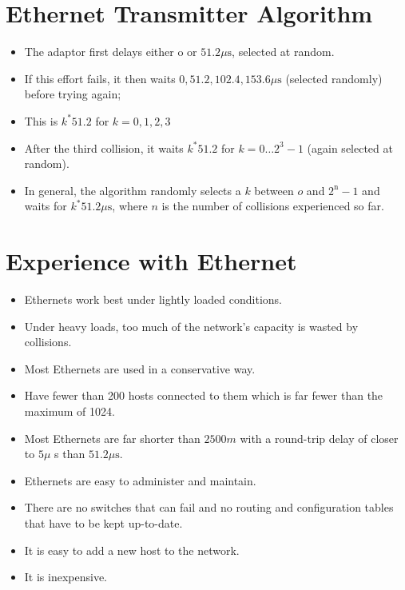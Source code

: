 \documentclass[10pt]{article}
\begin{document}
\section{Ethernet Transmitter Algorithm}
\begin{itemize}
  \item The adaptor first delays either o or $51.2 \mu \mathrm{s}$, selected at random.

  \item If this effort fails, it then waits $0,51.2,102.4,153.6 \mu \mathrm{s}$ (selected randomly) before trying again;

  \item This is $k^{*} 51.2$ for $k=0,1,2,3$

  \item After the third collision, it waits $k^{*} 51.2$ for $k=0 \ldots 2^{3}-1$ (again selected at random).

  \item In general, the algorithm randomly selects a $k$ between $o$ and $2^{\mathrm{n}}-1$ and waits for $k^{*} 51.2 \mu \mathrm{s}$, where $n$ is the number of collisions experienced so far.

\end{itemize}

\section{Experience with Ethernet}
\begin{itemize}
  \item Ethernets work best under lightly loaded conditions.

  \item Under heavy loads, too much of the network's capacity is wasted by collisions.

  \item Most Ethernets are used in a conservative way.

  \item Have fewer than 200 hosts connected to them which is far fewer than the maximum of 1024.

  \item Most Ethernets are far shorter than $2500 m$ with a round-trip delay of closer to $5 \mu$ s than $51.2 \mu \mathrm{s}$.

  \item Ethernets are easy to administer and maintain.

  \item There are no switches that can fail and no routing and configuration tables that have to be kept up-to-date.

  \item It is easy to add a new host to the network.

  \item It is inexpensive.

\end{itemize}
\end{document}
